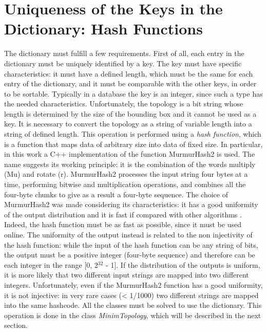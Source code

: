 \section{Uniqueness of the Keys in the Dictionary: Hash Functions}
The dictionary must fulfill a few requirements. First of all, each entry in the dictionary must be uniquely identified by a key. The key must have specific characteristics: it must have a defined length, which must be the same for each entry of the dictionary, and it must be comparable with the other keys, in order to be sortable. Typically in a database the key is an integer, since such a type has the needed characteristics. Unfortunately, the topology is a bit string whose length is determined by the size of the bounding box and it cannot be used as a key. It is necessary to convert the topology as a string of variable length into a string of defined length. This operation is performed using a \textit{hash function}, which is a function that maps data of arbitrary size into data of fixed size. In particular, in this work a C++ implementation of the function MurmurHash2 is used. The name suggests its working principle: it is the combination of the words multiply (Mu) and rotate (r). MurmurHash2 processes the input string four bytes at a time, performing bitwise and multiplication operations, and combines all the four-byte chunks to give as a result a four-byte sequence. The choice of MurmurHash2 was made considering its characteristics: it has a good uniformity of the output distribution and it is fast if compared with other algorithms \cite{hash}. Indeed, the hash function must be as fast as possible, since it must be used online. The uniformity of the output instead is related to the non injectivity of the hash function: while the input of the hash function can be any string of bits, the output must be a positive integer (four-byte sequence) and therefore can be each integer in the range [0, 2$^{32}$ - 1]. If the distribution of the outputs is uniform, it is more likely that two different input strings are mapped into two different integers. Unfortunately, even if the MurmurHash2 function has a good uniformity, it is not injective: in very rare cases (< 1/1000) two different strings are mapped into the same hashcode. All the classes must be solved to use the dictionary. This operation is done in the class \textit{MinimTopology}, which will be described in the next section.
%

